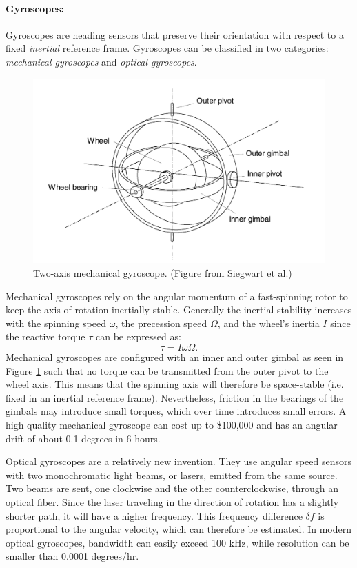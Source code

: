 \paragraph{Gyroscopes:} Gyroscopes are heading sensors that preserve their orientation with respect to a fixed \textit{inertial} reference frame. Gyroscopes can be classified in two categories: \textit{mechanical gyroscopes} and \textit{optical gyroscopes}.
\begin{figure}[ht]
\centering
        \includegraphics[width=.7\textwidth]{tex/figs/ch07_figs/gyro.png}
        \caption{Two-axis mechanical gyroscope. (Figure from Siegwart et al.) \nocite{SiegwartNourbakhshEtAl2011}}
        \label{fig:gyro}
\end{figure}
Mechanical gyroscopes rely on the angular momentum of a fast-spinning rotor to keep the axis of rotation inertially stable. Generally the inertial stability increases with the spinning speed $\omega$, the precession speed $\Omega$, and the wheel’s inertia $I$ since the reactive torque $\tau$ can be expressed as:
\begin{equation*}
    \tau = I \omega \Omega.
\end{equation*}
Mechanical gyroscopes are configured with an inner and outer gimbal as seen in Figure \ref{fig:gyro} such that no torque can be transmitted from the outer pivot to the wheel axis. This means that the spinning axis will therefore be space-stable (i.e. fixed in an inertial reference frame). Nevertheless, friction in the bearings of the gimbals may introduce small torques, which over time introduces small errors. A high quality mechanical gyroscope can cost up to \$100,000
and has an angular drift of about 0.1 degrees in 6 hours.

Optical gyroscopes are a relatively new invention. They use angular speed sensors with two monochromatic light beams, or lasers, emitted from the same source. Two beams are sent, one clockwise and the other counterclockwise, through an optical fiber. Since the laser traveling in the direction of rotation has a slightly shorter path, it will have a higher frequency. This frequency difference $\delta f$ is proportional to the angular velocity, which can therefore be estimated. In modern optical gyroscopes, bandwidth can easily exceed 100 kHz, while resolution can be smaller than 0.0001 degrees/hr.

